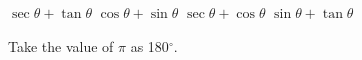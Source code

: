 \documentclass[11pt,paper=a4,answers]{exam}
\begin{document}
\begin{multicols}{2}
\begin{questions}
\begin{choices}
\choice $\displaystyle \sec \theta + \tan \theta$
\choice $\displaystyle \cos \theta + \sin \theta$
\choice $\displaystyle \sec \theta + \cos \theta$ 
\choice $\displaystyle \sin \theta + \tan \theta$  
\end{choices}
\end{questions}
\end{multicols}

\begin{center}
\Large{Take the value of $\pi$ as 180${^\circ}$.}
\end{center}

\newpage
\end{document}

